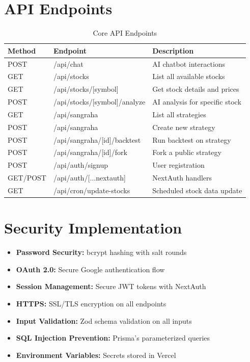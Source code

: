 \documentclass[11pt,a4paper]{article}
\begin{document}
\section{API Endpoints}

\begin{table}[h]
\centering
\begin{tabularx}{\textwidth}{llX}
\toprule
\textbf{Method} & \textbf{Endpoint} & \textbf{Description} \\
\midrule
POST & /api/chat & AI chatbot interactions \\
GET & /api/stocks & List all available stocks \\
GET & /api/stocks/[symbol] & Get stock details and prices \\
POST & /api/stocks/[symbol]/analyze & AI analysis for specific stock \\
GET & /api/sangraha & List all strategies \\
POST & /api/sangraha & Create new strategy \\
POST & /api/sangraha/[id]/backtest & Run backtest on strategy \\
POST & /api/sangraha/[id]/fork & Fork a public strategy \\
POST & /api/auth/signup & User registration \\
GET/POST & /api/auth/[...nextauth] & NextAuth handlers \\
GET & /api/cron/update-stocks & Scheduled stock data update \\
\bottomrule
\end{tabularx}
\caption{Core API Endpoints}
\end{table}

\section{Security Implementation}

\begin{featurebox}
\begin{itemize}[leftmargin=*]
    \item \textbf{Password Security:} bcrypt hashing with salt rounds
    \item \textbf{OAuth 2.0:} Secure Google authentication flow
    \item \textbf{Session Management:} Secure JWT tokens with NextAuth
    \item \textbf{HTTPS:} SSL/TLS encryption on all endpoints
    \item \textbf{Input Validation:} Zod schema validation on all inputs
    \item \textbf{SQL Injection Prevention:} Prisma's parameterized queries
    \item \textbf{Environment Variables:} Secrets stored in Vercel
\end{itemize}
\end{featurebox}
\end{document}
